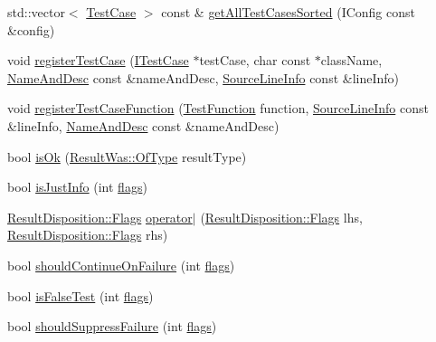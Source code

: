 \begin{DoxyCompactItemize}
\item 
std\-::vector$<$ \hyperlink{class_catch_1_1_test_case}{Test\-Case} $>$ const \& \hyperlink{namespace_catch_a1c9b1a23bc947ea70ddaabf067276cf2}{get\-All\-Test\-Cases\-Sorted} (I\-Config const \&config)
\item 
void \hyperlink{namespace_catch_a9a59d681cc327a33c280796561dfe258}{register\-Test\-Case} (\hyperlink{struct_catch_1_1_i_test_case}{I\-Test\-Case} $\ast$test\-Case, char const $\ast$class\-Name, \hyperlink{struct_catch_1_1_name_and_desc}{Name\-And\-Desc} const \&name\-And\-Desc, \hyperlink{struct_catch_1_1_source_line_info}{Source\-Line\-Info} const \&line\-Info)
\item 
void \hyperlink{namespace_catch_a220159aeff47f9c5231e893f2abbc643}{register\-Test\-Case\-Function} (\hyperlink{namespace_catch_a768da872b9033e4c71c6f316393d35db}{Test\-Function} function, \hyperlink{struct_catch_1_1_source_line_info}{Source\-Line\-Info} const \&line\-Info, \hyperlink{struct_catch_1_1_name_and_desc}{Name\-And\-Desc} const \&name\-And\-Desc)
\item 
bool \hyperlink{namespace_catch_a5205869c81c06d3460759cb86676ae68}{is\-Ok} (\hyperlink{struct_catch_1_1_result_was_a624e1ee3661fcf6094ceef1f654601ef}{Result\-Was\-::\-Of\-Type} result\-Type)
\item 
bool \hyperlink{namespace_catch_a54b01af61673a3e1f21f31713639b180}{is\-Just\-Info} (int \hyperlink{crow__all_8h_ab6b306ef981f5e21bb41ea2c2dbe8cd9}{flags})
\item 
\hyperlink{struct_catch_1_1_result_disposition_a3396cad6e2259af326b3aae93e23e9d8}{Result\-Disposition\-::\-Flags} \hyperlink{namespace_catch_ab32a083e442cc09f736327d2e2865999}{operator$\vert$} (\hyperlink{struct_catch_1_1_result_disposition_a3396cad6e2259af326b3aae93e23e9d8}{Result\-Disposition\-::\-Flags} lhs, \hyperlink{struct_catch_1_1_result_disposition_a3396cad6e2259af326b3aae93e23e9d8}{Result\-Disposition\-::\-Flags} rhs)
\item 
bool \hyperlink{namespace_catch_a7f7480b15d74965459c844f0d393ed87}{should\-Continue\-On\-Failure} (int \hyperlink{crow__all_8h_ab6b306ef981f5e21bb41ea2c2dbe8cd9}{flags})
\item 
bool \hyperlink{namespace_catch_a93ef4e3e307a2021ca0d41b32c0e54b0}{is\-False\-Test} (int \hyperlink{crow__all_8h_ab6b306ef981f5e21bb41ea2c2dbe8cd9}{flags})
\item 
bool \hyperlink{namespace_catch_ab91eb13081203d634fe48d3d2ab386d7}{should\-Suppress\-Failure} (int \hyperlink{crow__all_8h_ab6b306ef981f5e21bb41ea2c2dbe8cd9}{flags})

\end{DoxyCompactItemize}
